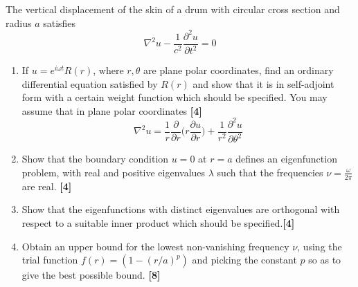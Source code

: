 \documentclass[a4paper]{article}
\begin{document}
\begin{qns}
The vertical displacement of the skin of a drum with circular cross section and radius $a$ satisfies
$$\nabla^2u-\frac{1}{c^2}\frac{\partial^2u}{\partial t^2}=0$$
\begin{enumerate}[label=(\roman*)]
\item If $u=e^{i\omega t}R(r)$, where $r,\theta$ are plane polar coordinates, find an ordinary differential equation satisfied by $R(r)$ and show that it is in self-adjoint form with a certain weight function which should be specified. You may assume that in plane polar coordinates \hfill \textbf{[4]}
$$\nabla^2u=\frac{1}{r}\frac{\partial}{\partial r}\bigg(r\frac{\partial u}{\partial r}\bigg)+\frac{1}{r^2}\frac{\partial^2u}{\partial\theta^2}$$
\item Show that the boundary condition $u = 0$ at $r = a$ defines an eigenfunction problem, with real and positive eigenvalues $\lambda$ such that the frequencies $\nu=\frac{\omega}{2\pi}$ are real. \hfill \textbf{[4]}
\item Show that the eigenfunctions with distinct eigenvalues are orthogonal with respect to a suitable inner product which should be specified.\hfill \textbf{[4]}
\item Obtain an upper bound for the lowest non-vanishing frequency $\nu$, using the trial function $f(r)=(1-(r/a)^p)$ and picking the constant $p$ so as to give the best possible bound. \hfill \textbf{[8]}
\end{enumerate}
\end{qns}
\end{document}
